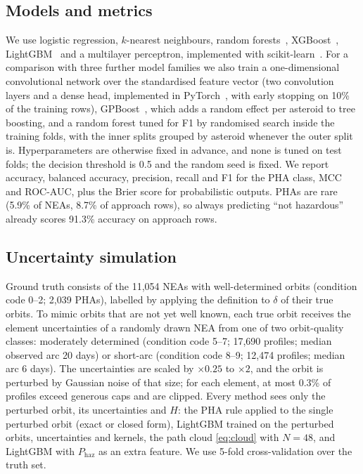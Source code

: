 \documentclass[make,article,submit,moreauthors]{Definitions/mdpi}
\begin{document}
\subsection{Models and metrics}
We use logistic regression, $k$-nearest neighbours, random forests~\cite{breiman2001}, XGBoost~\cite{chen2016}, LightGBM~\cite{ke2017} and a multilayer perceptron, implemented with scikit-learn~\cite{pedregosa2011}. For a comparison with three further model families we also train a one-dimensional convolutional network over the standardised feature vector (two convolution layers and a dense head, implemented in PyTorch~\cite{paszke2019}, with early stopping on 10\% of the training rows), GPBoost~\cite{sigrist2022}, which adds a random effect per asteroid to tree boosting, and a random forest tuned for F1 by randomised search inside the training folds, with the inner splits grouped by asteroid whenever the outer split is. Hyperparameters are otherwise fixed in advance, and none is tuned on test folds; the decision threshold is 0.5 and the random seed is fixed. We report accuracy, balanced accuracy, precision, recall and F1 for the PHA class, MCC~\cite{chicco2020} and ROC-AUC, plus the Brier score for probabilistic outputs. PHAs are rare (5.9\% of NEAs, 8.7\% of approach rows), so always predicting ``not hazardous'' already scores 91.3\% accuracy on approach rows.

\subsection{Uncertainty simulation}
Ground truth consists of the 11,054 NEAs with well-determined orbits (condition code 0--2; 2,039 PHAs), labelled by applying the definition to $\delta$ of their true orbits. To mimic orbits that are not yet well known, each true orbit receives the element uncertainties of a randomly drawn NEA from one of two orbit-quality classes: moderately determined (condition code 5--7; 17,690 profiles; median observed arc 20 days) or short-arc (condition code 8--9; 12,474 profiles; median arc 6 days). The uncertainties are scaled by $\times0.25$ to $\times2$, and the orbit is perturbed by Gaussian noise of that size; for each element, at most 0.3\% of profiles exceed generous caps and are clipped. Every method sees only the perturbed orbit, its uncertainties and $H$: the PHA rule applied to the single perturbed orbit (exact or closed form), LightGBM trained on the perturbed orbits, uncertainties and kernels, the path cloud \eqref{eq:cloud} with $N = 48$, and LightGBM with $P_{\mathrm{haz}}$ as an extra feature. We use 5-fold cross-validation over the truth set.
\end{document}
